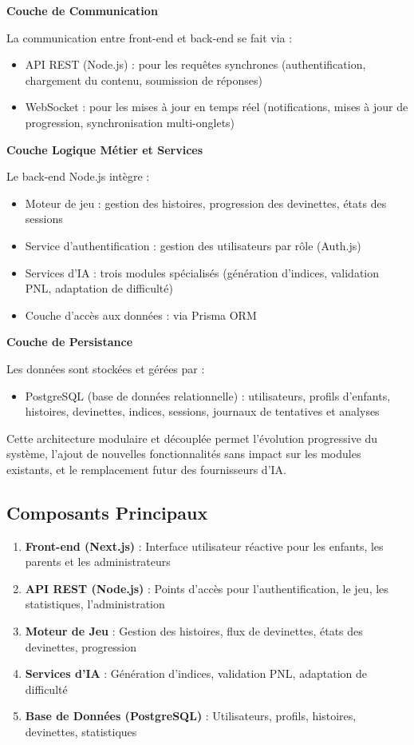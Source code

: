 \documentclass[12pt,a4paper]{article}
\begin{document}
\textbf{Couche de Communication}

La communication entre front-end et back-end se fait via :
\begin{itemize}
    \item API REST (Node.js) : pour les requêtes synchrones (authentification, chargement du contenu, soumission de réponses)
    \item WebSocket : pour les mises à jour en temps réel (notifications, mises à jour de progression, synchronisation multi-onglets)
\end{itemize}

\textbf{Couche Logique Métier et Services}

Le back-end Node.js intègre :
\begin{itemize}
    \item Moteur de jeu : gestion des histoires, progression des devinettes, états des sessions
    \item Service d'authentification : gestion des utilisateurs par rôle (Auth.js)
    \item Services d'IA : trois modules spécialisés (génération d'indices, validation PNL, adaptation de difficulté)
    \item Couche d'accès aux données : via Prisma ORM
\end{itemize}

\textbf{Couche de Persistance}

Les données sont stockées et gérées par :
\begin{itemize}
    \item PostgreSQL (base de données relationnelle) : utilisateurs, profils d'enfants, histoires, devinettes, indices, sessions, journaux de tentatives et analyses
\end{itemize}

Cette architecture modulaire et découplée permet l'évolution progressive du système, l'ajout de nouvelles fonctionnalités sans impact sur les modules existants, et le remplacement futur des fournisseurs d'IA.

\subsection{Composants Principaux}

\begin{enumerate}
    \item \textbf{Front-end (Next.js)} : Interface utilisateur réactive pour les enfants, les parents et les administrateurs
    \item \textbf{API REST (Node.js)} : Points d'accès pour l'authentification, le jeu, les statistiques, l'administration
    \item \textbf{Moteur de Jeu} : Gestion des histoires, flux de devinettes, états des devinettes, progression
    \item \textbf{Services d'IA} : Génération d'indices, validation PNL, adaptation de difficulté
    \item \textbf{Base de Données (PostgreSQL)} : Utilisateurs, profils, histoires, devinettes, statistiques
\end{enumerate}
\end{document}
